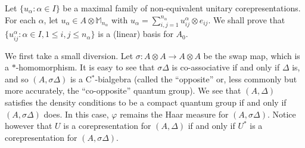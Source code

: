 \documentclass[twoside,a4paper,12pt]{article}
\theoremstyle{plain}
\theoremstyle{definition}
\begin{document}
Let $\{u_\alpha : \alpha\in I\}$ be a maximal family of non-equivalent
unitary corepresentations.  For each $\alpha$, let $u_\alpha \in A
\otimes \mathbb M_{n_\alpha}$ with $u_\alpha = \sum_{i,j=1}^{n_\alpha}
u^\alpha_{ij} \otimes e_{ij}$.  We shall prove that $\{ u^\alpha_{ij}
: \alpha\in I, 1\leq i,j\leq n_\alpha \}$ is a (linear) basis for $A_0$.

We first take a small diversion.  Let $\sigma:A\otimes A\rightarrow A\otimes A$
be the swap map, which is a $*$-homomorphism.  It is easy to see that
$\sigma \Delta$ is co-associative if and only if $\Delta$ is, and so
$(A,\sigma\Delta)$ is a C$^*$-bialgebra (called the ``opposite'' or, less
commonly but more accurately, the ``co-opposite'' quantum group).  We see that
$(A,\Delta)$ satisfies the density conditions to be a compact quantum group
if and only if $(A,\sigma\Delta)$ does.  In this case, $\varphi$ remains the
Haar measure for $(A,\sigma\Delta)$.  Notice however that $U$ is a
corepresentation for $(A,\Delta)$ if and only if $U^*$ is a 
corepresentation for $(A,\sigma\Delta)$.
\end{document}

